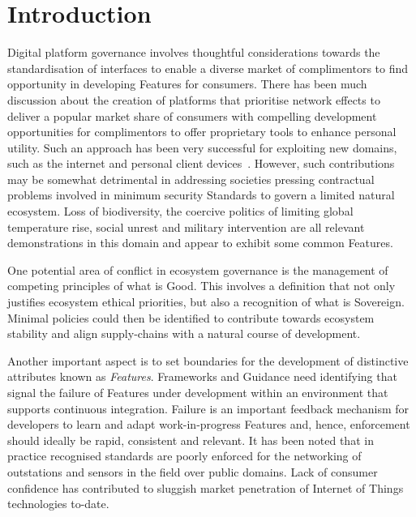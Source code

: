 \documentclass[11pt, oneside]{book}   	%
\begin{document}
\newpage
\thispagestyle{empty}
\mbox{}
\newpage

\newpage
\thispagestyle{empty}
\mbox{}
\newpage

\chapter{Introduction}
Digital platform governance involves thoughtful considerations towards the standardisation of interfaces to enable a diverse market of complimentors to find opportunity in developing Features for consumers.
There has been much discussion about the creation of platforms that prioritise network effects to deliver a popular market share of consumers with compelling development opportunities for complimentors to offer proprietary tools to enhance personal utility.
Such an approach has been very successful for exploiting new domains, such as the internet and personal client devices~\cite{bop1}.
However, such contributions may be somewhat detrimental in addressing societies pressing contractual problems involved in minimum security Standards to govern a limited natural ecosystem.
Loss of biodiversity, the coercive politics of limiting global temperature rise, social unrest and military intervention are all relevant demonstrations in this domain and appear to exhibit some common Features.\

One potential area of conflict in ecosystem governance is the management of competing principles of what is Good.
This involves a definition that not only justifies ecosystem ethical priorities, but also a recognition of what is Sovereign.
Minimal policies could then be identified to contribute towards ecosystem stability and align supply-chains with a natural course of development.\

Another important aspect is to set boundaries for the development of distinctive attributes known as \emph{Features}.
Frameworks and Guidance need identifying that signal the failure of Features under development within an environment that supports continuous integration.
Failure is an important feedback mechanism for developers to learn and adapt work-in-progress Features and, hence, enforcement should ideally be rapid, consistent and relevant.
It has been noted that in practice recognised standards are poorly enforced for the networking of outstations and sensors in the field over public domains.
Lack of consumer confidence has contributed to sluggish market penetration of Internet of Things technologies to-date.\
\end{document}
